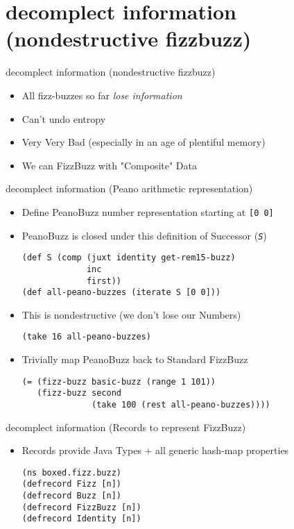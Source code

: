 \documentclass[presentation]{beamer}
\begin{document}
\section{decomplect information (nondestructive fizzbuzz)}
\label{sec:org3bdf635}
\begin{frame}[label={sec:org0426aee}]{decomplect information (nondestructive fizzbuzz)}
\begin{itemize}
\item All fizz-buzzes so far \emph{lose information}
\item Can't undo entropy
\item Very Very Bad (especially in an age of plentiful memory)
\item We can FizzBuzz with "Composite" Data
\end{itemize}
\end{frame}
\begin{frame}[label={sec:org64d507b},fragile]{decomplect information (Peano arithmetic representation)}
 \begin{itemize}
\item Define PeanoBuzz number representation starting at \texttt{[0 0]}
\item PeanoBuzz is closed under this definition of Successor (\emph{\texttt{S}})
\begin{verbatim}
(def S (comp (juxt identity get-rem15-buzz)
             inc
             first))
(def all-peano-buzzes (iterate S [0 0]))
\end{verbatim}
\item This is nondestructive (we don't lose our Numbers)
\begin{verbatim}
(take 16 all-peano-buzzes)
\end{verbatim}
\item Trivially map PeanoBuzz back to Standard FizzBuzz
\begin{verbatim}
(= (fizz-buzz basic-buzz (range 1 101))
   (fizz-buzz second
              (take 100 (rest all-peano-buzzes))))
\end{verbatim}
\end{itemize}
\end{frame}
\begin{frame}[label={sec:org02c3153},fragile]{decomplect information (Records to represent FizzBuzz)}
 \begin{itemize}
\item Records provide Java Types + all generic hash-map properties
\begin{verbatim}
(ns boxed.fizz.buzz)
(defrecord Fizz [n])
(defrecord Buzz [n])
(defrecord FizzBuzz [n])
(defrecord Identity [n])
\end{verbatim}
\end{itemize}
\end{frame}
\end{document}
